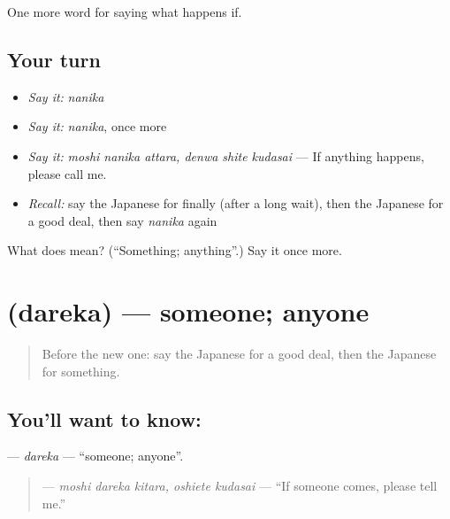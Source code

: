 \begin{grammarlens}[title={What you've built}]
One more word for saying what happens if.
\end{grammarlens}

\subsection*{Your turn}
\begin{itemize}
\raggedright
  \item \emph{Say it:} \emph{nanika}
  \item \emph{Say it:} \emph{nanika}, once more
  \item \emph{Say it:} \emph{moshi nanika attara, denwa shite kudasai} — If anything happens, please call me.
  \item \emph{Recall:} say the Japanese for finally (after a long wait), then the Japanese for a good deal, then say \emph{nanika} again
\end{itemize}

\begin{tcolorbox}[breakable,colback=teal!4,colframe=teal!35!black,title={Before you move on}]
What does  mean? (\textquotedblleft{}Something; anything\textquotedblright{}.) Say it once more.
\end{tcolorbox}
\section[\texorpdfstring{\ja{だれか} (dareka)}{だれか (dareka)}]{ (dareka) — someone; anyone}

\label{lesson:JA-C522-dareka}



\begin{quote}
Before the new one: say the Japanese for a good deal, then the Japanese for something.
\end{quote}

\subsection*{You'll want to know: }
\textbf{} — \emph{dareka} — \textquotedblleft{}someone; anyone\textquotedblright{}.

\begin{quote}
\textbf{   } — \emph{moshi dareka kitara, oshiete kudasai} — \textquotedblleft{}If someone comes, please tell me.\textquotedblright{}
\end{quote}

